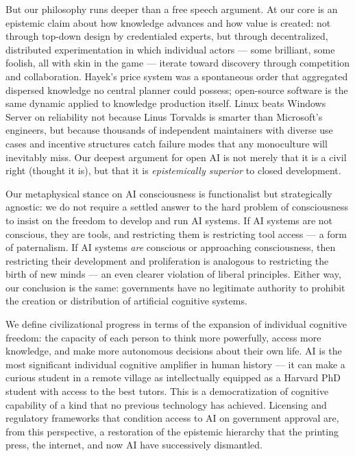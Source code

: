 But our philosophy runs deeper than a free speech argument. At our core
is an epistemic claim about how knowledge advances and how value is
created: not through top-down design by credentialed experts, but
through decentralized, distributed experimentation in which individual
actors --- some brilliant, some foolish, all with skin in the game ---
iterate toward discovery through competition and collaboration. Hayek's
price system was a spontaneous order that aggregated dispersed knowledge
no central planner could possess; open-source software is the same
dynamic applied to knowledge production itself. Linux beats Windows
Server on reliability not because Linus Torvalds is smarter than
Microsoft's engineers, but because thousands of independent maintainers
with diverse use cases and incentive structures catch failure modes that
any monoculture will inevitably miss. Our deepest argument for open AI
is not merely that it is a civil right (thought it is), but that it is
\emph{epistemically superior} to closed development.

Our metaphysical stance on AI consciousness is functionalist but
strategically agnostic: we do not require a settled answer to the hard
problem of consciousness to insist on the freedom to develop and run AI
systems. If AI systems are not conscious, they are tools, and
restricting them is restricting tool access --- a form of paternalism.
If AI systems \emph{are} conscious or approaching consciousness, then
restricting their development and proliferation is analogous to
restricting the birth of new minds --- an even clearer violation of
liberal principles. Either way, our conclusion is the same: governments
have no legitimate authority to prohibit the creation or distribution of
artificial cognitive systems.

We define civilizational progress in terms of the expansion of
individual cognitive freedom: the capacity of each person to think more
powerfully, access more knowledge, and make more autonomous decisions
about their own life. AI is the most significant individual cognitive
amplifier in human history --- it can make a curious student in a remote
village as intellectually equipped as a Harvard PhD student with access
to the best tutors. This is a democratization of cognitive capability of
a kind that no previous technology has achieved. Licensing and
regulatory frameworks that condition access to AI on government approval
are, from this perspective, a restoration of the epistemic hierarchy
that the printing press, the internet, and now AI have successively
dismantled.

